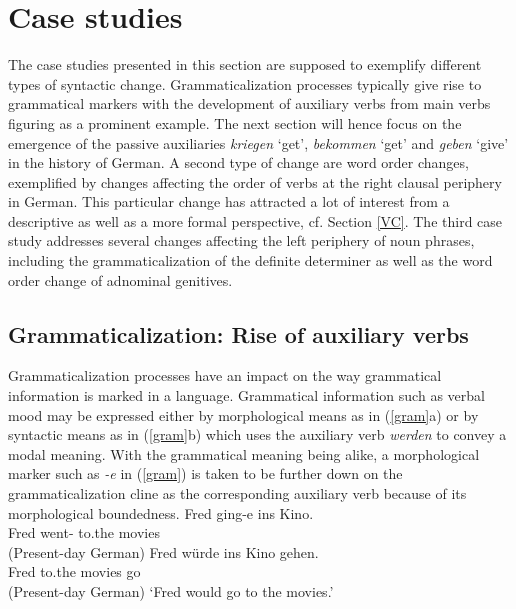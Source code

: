 \documentclass[output=paper
                ,modfonts
                ,nonflat
	        ,collection
	        ,collectionchapter
	        ,collectiontoclongg
 	        ,biblatex
                ,babelshorthands
                ,newtxmath
                ,draftmode
                ,colorlinks, citecolor=brown
]{./langsci/langscibook}
\begin{document}
\section{Case studies}

The case studies presented in this section are supposed to exemplify different types of syntactic change. Grammaticalization processes typically give rise to grammatical markers with the development of auxiliary verbs from main verbs figuring as a prominent example. The next section will hence focus on the emergence of the passive auxiliaries \textit{kriegen} `get', \textit{bekommen} `get' and \textit{geben} `give' in the history of German. A second type of change are word order changes, exemplified by changes affecting the order of verbs at the right clausal periphery in German. This particular change has attracted a lot of interest from a descriptive as well as a more formal perspective, cf. Section \ref{VC}. The third case study addresses several changes affecting the left periphery of noun phrases, including the grammaticalization of the definite determiner as well as the word order change of adnominal genitives. 

\subsection{Grammaticalization: Rise of auxiliary verbs \label{GR}} 

Grammaticalization processes have an impact on the way grammatical information is marked in a language. Grammatical information such as verbal mood may be expressed either by morphological means as in (\ref{gram}a) or by syntactic means as in (\ref{gram}b) which uses the auxiliary verb \textit{werden} to convey a modal meaning. With the grammatical meaning being alike, a morphological marker such as \textit{-e} in (\ref{gram}) is taken to be further down on the grammaticalization cline as the corresponding auxiliary verb because of its morphological boundedness.  
\eal \label{gram}
\ex 
\gll Fred ging-e ins Kino. \\  Fred went-\SBJV{} to.the movies \\  \hfill (Present-day German)
\ex
\gll  Fred würde ins Kino gehen. \\ Fred \SBJV{} to.the movies go \\  \hfill (Present-day German)
\glt `Fred would go to the movies.'
\zl
\end{document}
